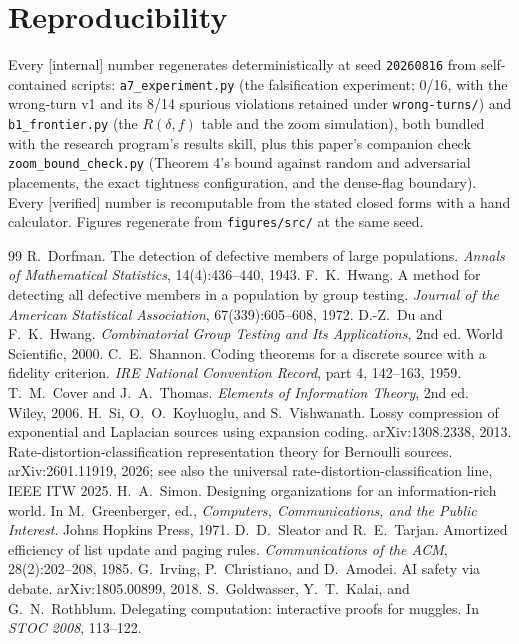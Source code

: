 \documentclass[11pt,a4paper]{article}
\begin{document}
\section{Reproducibility}\label{sec:repro}
Every [internal] number regenerates deterministically at seed \texttt{20260816} from self-contained scripts: \texttt{a7\_experiment.py} (the falsification experiment; 0/16, with the wrong-turn v1 and its 8/14 spurious violations retained under \texttt{wrong-turns/}) and \texttt{b1\_frontier.py} (the $R(\delta,f)$ table and the zoom simulation), both bundled with the research program's results skill, plus this paper's companion check \texttt{zoom\_bound\_check.py} (Theorem 4's bound against random and adversarial placements, the exact tightness configuration, and the dense-flag boundary). Every [verified] number is recomputable from the stated closed forms with a hand calculator. Figures regenerate from \texttt{figures/src/} at the same seed.

\begin{thebibliography}{99}
 R.~Dorfman. The detection of defective members of large populations. \emph{Annals of Mathematical Statistics}, 14(4):436--440, 1943.
 F.~K.~Hwang. A method for detecting all defective members in a population by group testing. \emph{Journal of the American Statistical Association}, 67(339):605--608, 1972.
 D.-Z.~Du and F.~K.~Hwang. \emph{Combinatorial Group Testing and Its Applications}, 2nd ed. World Scientific, 2000.
 C.~E.~Shannon. Coding theorems for a discrete source with a fidelity criterion. \emph{IRE National Convention Record}, part 4, 142--163, 1959.
 T.~M.~Cover and J.~A.~Thomas. \emph{Elements of Information Theory}, 2nd ed. Wiley, 2006.
 H.~Si, O.~O.~Koyluoglu, and S.~Vishwanath. Lossy compression of exponential and Laplacian sources using expansion coding. arXiv:1308.2338, 2013.
 Rate-distortion-classification representation theory for Bernoulli sources. arXiv:2601.11919, 2026; see also the universal rate-distortion-classification line, IEEE ITW 2025.
 H.~A.~Simon. Designing organizations for an information-rich world. In M.~Greenberger, ed., \emph{Computers, Communications, and the Public Interest}. Johns Hopkins Press, 1971.
 D.~D.~Sleator and R.~E.~Tarjan. Amortized efficiency of list update and paging rules. \emph{Communications of the ACM}, 28(2):202--208, 1985.
 G.~Irving, P.~Christiano, and D.~Amodei. AI safety via debate. arXiv:1805.00899, 2018.
 S.~Goldwasser, Y.~T.~Kalai, and G.~N.~Rothblum. Delegating computation: interactive proofs for muggles. In \emph{STOC 2008}, 113--122.
\end{thebibliography}
\end{document}

